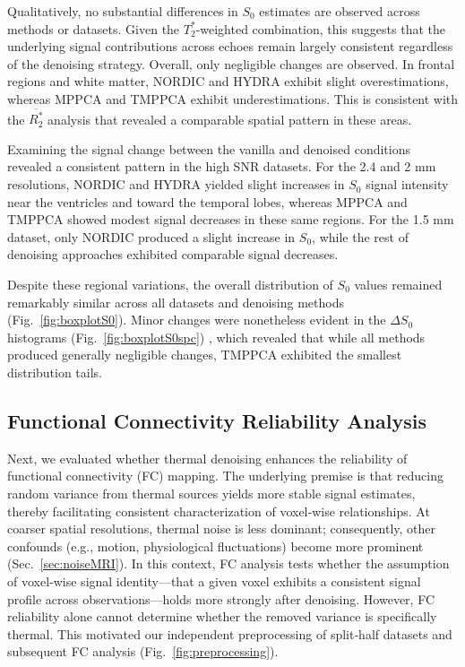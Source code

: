 Qualitatively, no substantial differences in $S_0$ estimates are observed across methods or datasets. Given the $T_2^*$-weighted combination, this suggests that the underlying signal contributions across echoes remain largely consistent regardless of the denoising strategy.  Overall, only negligible changes are observed. In frontal regions and white matter, NORDIC and HYDRA exhibit slight overestimations, whereas MPPCA and TMPPCA exhibit underestimations. This is consistent with the $\overline{R_2^*}$ analysis that revealed a comparable spatial pattern in these areas.

Examining the signal change between the vanilla and denoised conditions revealed a consistent pattern in the high SNR datasets. For the 2.4 and 2 mm resolutions, NORDIC and HYDRA yielded slight increases in $S_0$ signal intensity near the ventricles and toward the temporal lobes, whereas MPPCA and TMPPCA showed modest signal decreases in these same regions. For the 1.5 mm dataset, only NORDIC produced a slight increase in $S_0$, while the rest of denoising approaches exhibited comparable signal decreases.

Despite these regional variations, the overall distribution of $S_0$ values remained remarkably similar across all datasets and denoising methods (Fig.~\ref{fig:boxplotS0}). Minor changes were nonetheless evident in the $\Delta S_0$ histograms (Fig.~\ref{fig:boxplotS0spc}) , which revealed that while all methods produced generally negligible changes, TMPPCA exhibited the smallest distribution tails.

\subsection{Functional Connectivity Reliability Analysis}


Next, we evaluated whether thermal denoising enhances the reliability of functional connectivity (FC) mapping. The underlying premise is that reducing random variance from thermal sources yields more stable signal estimates, thereby facilitating consistent characterization of voxel‑wise relationships. At coarser spatial resolutions, thermal noise is less dominant; consequently, other confounds (e.g., motion, physiological fluctuations) become more prominent (Sec.~\ref{sec:noiseMRI}). In this context, FC analysis tests whether the assumption of voxel‑wise signal identity—that a given voxel exhibits a consistent signal profile across observations—holds more strongly after denoising. However, FC reliability alone cannot determine whether the removed variance is specifically thermal. This motivated our independent preprocessing of split‑half datasets and subsequent FC analysis (Fig.~\ref{fig:preprocessing}).


